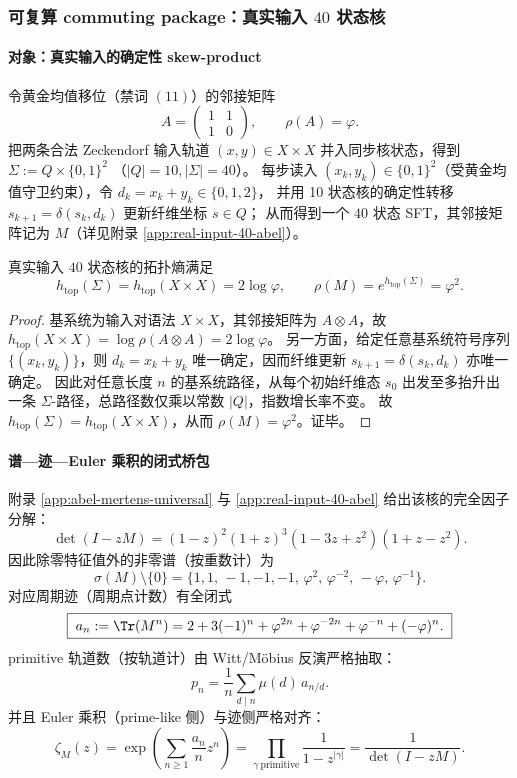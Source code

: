 \subsubsection{可复算 commuting package：真实输入 $40$ 状态核}\label{subsec:real-input-40-commuting-package}
\paragraph{对象：真实输入的确定性 skew-product}
令黄金均值移位（禁词 $(11)$）的邻接矩阵
\[
A=\begin{pmatrix}1&1\\[2pt]1&0\end{pmatrix},\qquad \rho(A)=\varphi.
\]
把两条合法 Zeckendorf 输入轨道 $(x,y)\in X\times X$ 并入同步核状态，得到
\(
\Sigma:=Q\times\{0,1\}^2
\)
（$|Q|=10,|\Sigma|=40$）。
每步读入 $(x_k,y_k)\in\{0,1\}^2$（受黄金均值守卫约束），令 $d_k=x_k+y_k\in\{0,1,2\}$，
并用 10 状态核的确定性转移 $s_{k+1}=\delta(s_k,d_k)$ 更新纤维坐标 $s\in Q$；
从而得到一个 $40$ 状态 SFT，其邻接矩阵记为 $M$（详见附录 \ref{app:real-input-40-abel}）。

\begin{proposition}[确定性扩张不增熵：$\rho(M)=\varphi^2$]\label{prop:real-input-40-entropy}
真实输入 $40$ 状态核的拓扑熵满足
\[
h_{\mathrm{top}}(\Sigma)=h_{\mathrm{top}}(X\times X)=2\log\varphi,
\qquad
\rho(M)=e^{h_{\mathrm{top}}(\Sigma)}=\varphi^2.
\]
\end{proposition}
\begin{proof}
基系统为输入对语法 $X\times X$，其邻接矩阵为 $A\otimes A$，故 $h_{\mathrm{top}}(X\times X)=\log\rho(A\otimes A)=2\log\varphi$。
另一方面，给定任意基系统符号序列 $\{(x_k,y_k)\}$，则 $d_k=x_k+y_k$ 唯一确定，因而纤维更新 $s_{k+1}=\delta(s_k,d_k)$ 亦唯一确定。
因此对任意长度 $n$ 的基系统路径，从每个初始纤维态 $s_0$ 出发至多抬升出一条 $\Sigma$-路径，总路径数仅乘以常数 $|Q|$，指数增长率不变。
故 $h_{\mathrm{top}}(\Sigma)=h_{\mathrm{top}}(X\times X)$，从而 $\rho(M)=\varphi^2$。证毕。
\end{proof}

\paragraph{谱—迹—Euler 乘积的闭式桥包}
附录 \ref{app:abel-mertens-universal} 与 \ref{app:real-input-40-abel} 给出该核的完全因子分解：
\[
\boxed{\;
\det(I-zM)=(1-z)^2(1+z)^3(1-3z+z^2)(1+z-z^2).\;}
\]
因此除零特征值外的非零谱（按重数计）为
\[
\sigma(M)\setminus\{0\}=\{1,1,\,-1,-1,-1,\,\varphi^2,\,\varphi^{-2},\,-\varphi,\,\varphi^{-1}\}.
\]
对应周期迹（周期点计数）有全闭式
\[
\boxed{\;
a_n:=\Tr(M^n)=
2+3(-1)^n+\varphi^{2n}+\varphi^{-2n}+\varphi^{-n}+(-\varphi)^n.\;}
\]
primitive 轨道数（按轨道计）由 Witt/Möbius 反演严格抽取：
\[
\boxed{\;
p_n=\frac1n\sum_{d\mid n}\mu(d)\,a_{n/d}.\;}
\]
并且 Euler 乘积（prime-like 侧）与迹侧严格对齐：
\[
\zeta_M(z)
=\exp\!\left(\sum_{n\ge 1}\frac{a_n}{n}z^n\right)
=\prod_{\gamma\ \mathrm{primitive}}\frac{1}{1-z^{|\gamma|}}
=\frac{1}{\det(I-zM)}.
\]

